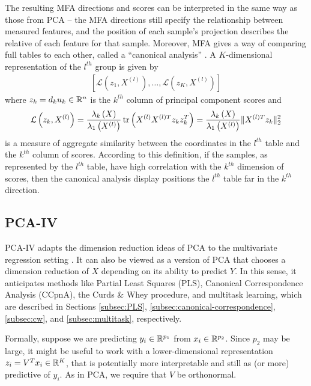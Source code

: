 \documentclass[14pt]{extarticle}
\begin{document}
The resulting MFA directions and scores can be interpreted in the same
way as those from PCA -- the MFA directions still specify the
relationship between measured features, and the position of each
sample's projection describes the relative  of each feature for
that sample. Moreover, MFA gives a way of comparing full tables to
each other, called a ``canonical analysis'' \citep{pages2004multiple}. A
$K$-dimensional representation of the $l^{th}$ group is given by
\begin{align*}
\left[\mathcal{L}\left(z_{1}, X^{(l)}\right), \dots,
  \mathcal{L}\left(z_{K}, X^{(l)}\right)\right]
\end{align*}
where $z_{k} = d_{k}u_{k} \in \mathbb{R}^{n}$ is the $k^{th}$ column of principal
component scores and
\begin{align*}
  \mathcal{L}\left(z_{k}, X^{(l)}\right) =
  \frac{\lambda_{k}\left(X\right)}{\lambda_{1}\left(X^{(l)}\right)}\mathop\mathrm{tr}\left(X^{(l)}X^{(l)
      T} z_{k}z_{k}^{T}\right) =
  \frac{\lambda_{k}\left(X\right)}{\lambda_{1}\left(X^{(l)}\right)}\|X^{(l)
  T} z_{k}\|^{2}_{2}
\end{align*}
is a measure of aggregate similarity between the coordinates in the $l^{th}$
table and the $k^{th}$ column of scores. According to this definition, if the
samples, as represented by the $l^{th}$ table, have high correlation with the
$k^{th}$ dimension of scores, then the canonical analysis display positions the
$l^{th}$ table far in the $k^{th}$ direction.

\subsection{PCA-IV}

PCA-IV adapts the dimension reduction ideas of PCA to the multivariate
regression setting \citep{rao1964use}. It can also be viewed as a version of PCA
that chooses a dimension reduction of $X$ depending on its ability to predict
$Y$. In this sense, it anticipates methods like Partial Least Squares (PLS),
Canonical Correspondence Analysis (CCpnA), the Curds \& Whey procedure, and
multitask learning, which are described in Sections \ref{subsec:PLS},
\ref{subsec:canonical-correspondence}, \ref{subsec:cw}, and
\ref{subsec:multitask}, respectively.

Formally, suppose we are predicting $y_{i} \in \mathbb{R}^{p_{1}}$ from $x_{i} \in
\mathbb{R}^{p_{2}}$. Since $p_{2}$ may be large, it might be useful to work with a
lower-dimensional representation $z_{i} = V^{T}x_{i} \in \mathbb{R}^{K}$, that is
potentially more interpretable and still as (or more) predictive of $y_{i}$. As
in PCA, we require that $V$ be orthonormal.
\end{document}
